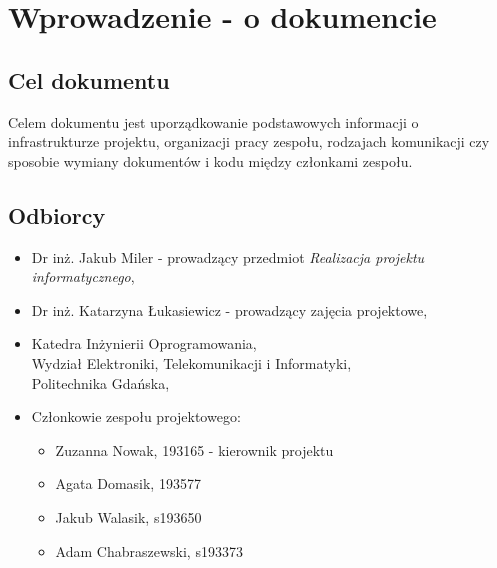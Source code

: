 \documentclass[12pt,a4paper,colorlinks=true,linkcolor=NavyBlue,citecolor=red,urlcolor=NavyBlue]{book}
\begin{document}


\tableofcontents

\chapter{Wprowadzenie - o dokumencie}
\section{Cel dokumentu}
Celem dokumentu jest uporządkowanie podstawowych informacji o infrastrukturze projektu, organizacji pracy zespołu, rodzajach komunikacji czy sposobie wymiany dokumentów i kodu między członkami zespołu. 

\section{Odbiorcy}

\begin{itemize}
    \item Dr inż. Jakub Miler - prowadzący przedmiot \textit{Realizacja projektu informatycznego},
    \item Dr inż. Katarzyna Łukasiewicz - prowadzący zajęcia projektowe,
    \item Katedra Inżynierii Oprogramowania, \\[2mm] 
Wydział Elektroniki, Telekomunikacji i Informatyki, \\[2mm]  
Politechnika Gdańska,
    \item Członkowie zespołu projektowego:
    \begin{itemize}
        \item[] Zuzanna Nowak, 193165 - kierownik projektu
        \item[] Agata Domasik, 193577
        \item[] Jakub Walasik, s193650
        \item[] Adam Chabraszewski, s193373
    \end{itemize}
\end{itemize}
\end{document}
